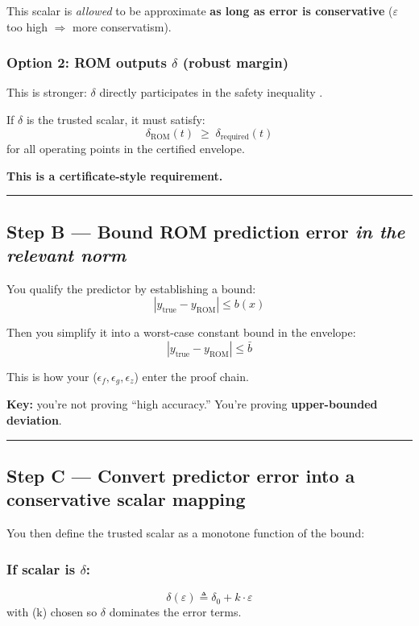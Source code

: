 \documentclass[11pt,a4paper]{article}
\begin{document}
This scalar is \textit{allowed} to be approximate \textbf{as long as error is conservative} ($\varepsilon$ too high $\Rightarrow$ more conservatism).

\subsubsection*{Option 2: ROM outputs \textbf{$\delta$} (robust margin)}

This is stronger: $\delta$ directly participates in the safety inequality .

If $\delta$ is the trusted scalar, it must satisfy:
\[
\delta_{\text{ROM}}(t)\;\ge\;\delta_{\text{required}}(t)
\]
for all operating points in the certified envelope.

\textbf{This is a certificate-style requirement.}

\hrule
\vspace{0.75em}

\subsection*{Step B — Bound ROM prediction error \textit{in the relevant norm}}

You qualify the predictor by establishing a bound:
\[
|y_{\text{true}} - y_{\text{ROM}}| \le b(x)
\]

Then you simplify it into a worst-case constant bound in the envelope:
\[
|y_{\text{true}} - y_{\text{ROM}}| \le \bar b
\]

This is how your ($\epsilon_f,\epsilon_g,\epsilon_z$) enter the proof chain.

\textbf{Key:} you’re not proving ``high accuracy.''
You’re proving \textbf{upper-bounded deviation}.

\hrule
\vspace{0.75em}

\subsection*{Step C — Convert predictor error into a conservative scalar mapping}

You then define the trusted scalar as a monotone function of the bound:

\subsubsection*{If scalar is $\delta$:}

\[
\delta(\varepsilon) \triangleq \delta_0 + k\cdot \varepsilon
\]
with (k) chosen so $\delta$ dominates the error terms.
\end{document}
